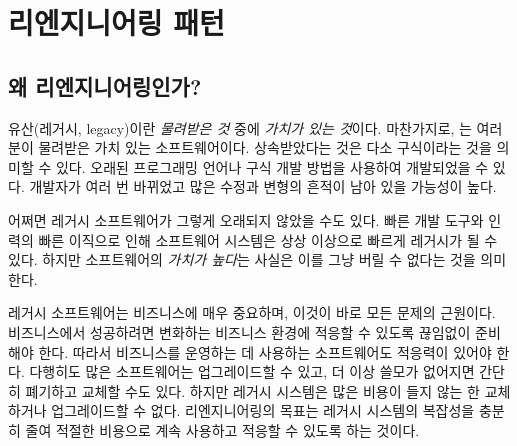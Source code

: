 \documentclass[a4paper,10pt,twoside]{book}
\begin{document}
	\sloppy
\fi
\chapter{리엔지니어링 패턴}

\section{왜 리엔지니어링인가?}

유산(레거시, legacy)이란 \emph{물려받은 것} 중에 \emph{가치가 있는 것}이다. 마찬가지로, 는 여러분이 물려받은 가치 있는 소프트웨어이다. 상속받았다는 것은 다소 구식이라는 것을 의미할 수 있다. 오래된 프로그래밍 언어나 구식 개발 방법을 사용하여 개발되었을 수 있다. 개발자가 여러 번 바뀌었고 많은 수정과 변형의 흔적이 남아 있을 가능성이 높다. 

어쩌면 레거시 소프트웨어가 그렇게 오래되지 않았을 수도 있다. 빠른 개발 도구와 인력의 빠른 이직으로 인해 소프트웨어 시스템은 상상 이상으로 빠르게 레거시가 될 수 있다. 하지만 소프트웨어의 \emph{가치가 높다}는 사실은 이를 그냥 버릴 수 없다는 것을 의미한다. 

레거시 소프트웨어는 비즈니스에 매우 중요하며, 이것이 바로 모든 문제의 근원이다. 비즈니스에서 성공하려면 변화하는 비즈니스 환경에 적응할 수 있도록 끊임없이 준비해야 한다. 따라서 비즈니스를 운영하는 데 사용하는 소프트웨어도 적응력이 있어야 한다. 다행히도 많은 소프트웨어는 업그레이드할 수 있고, 더 이상 쓸모가 없어지면 간단히 폐기하고 교체할 수도 있다. 하지만 레거시 시스템은 많은 비용이 들지 않는 한 교체하거나 업그레이드할 수 없다. 리엔지니어링의 목표는 레거시 시스템의 복잡성을 충분히 줄여 적절한 비용으로 계속 사용하고 적응할 수 있도록 하는 것이다. 
\end{document}
